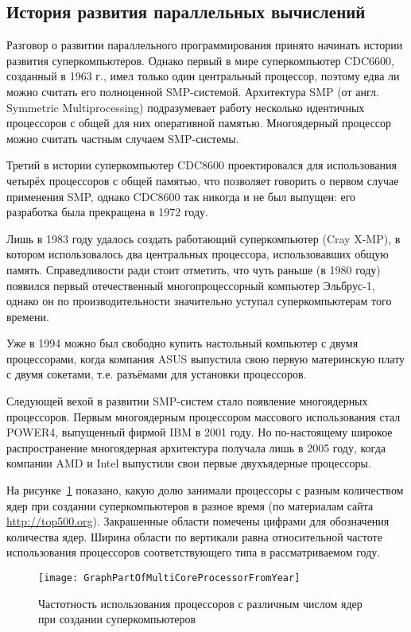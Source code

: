 \subsection{История развития параллельных вычислений}

Разговор о развитии параллельного программирования принято начинать истории развития суперкомпьютеров. Однако первый в мире суперкомпьютер CDC6600, созданный в 1963 г., имел только один центральный процессор, поэтому едва ли можно считать его полноценной SMP-системой. Архитектура SMP (от англ. Symmetric Multiprocessing) подразумевает работу несколько идентичных процессоров с общей для них оперативной памятью. Многоядерный процессор можно считать частным случаем SMP-системы.

Третий в истории суперкомпьютер CDC8600 проектировался для использования четырёх процессоров с общей памятью, что позволяет говорить о первом случае применения SMP, однако CDC8600 так никогда и не был выпущен: его разработка была прекращена в 1972 году.

Лишь в 1983 году удалось создать работающий суперкомпьютер (Cray X-MP), в котором использовалось два центральных процессора, использовавших общую память. Справедливости ради стоит отметить, что чуть раньше (в 1980 году) появился первый отечественный многопроцессорный компьютер Эльбрус-1, однако он по производительности значительно уступал суперкомпьютерам того времени.

Уже в 1994 можно был свободно купить настольный компьютер с двумя процессорами, когда компания ASUS выпустила свою первую материнскую плату с двумя сокетами, т.е. разъёмами для установки процессоров.

Следующей вехой в развитии SMP-систем стало появление многоядерных процессоров. Первым многоядерным процессором массового использования стал POWER4, выпущенный фирмой IBM в 2001 году. Но по-настоящему широкое распространение многоядерная архитектура получала лишь в 2005 году, когда компании AMD и Intel выпустили свои первые двухъядерные процессоры.  

На рисунке~\ref{GraphPartOfMultiCoreProcessorFromYear:image} показано, какую долю занимали процессоры с разным количеством ядер при создании суперкомпьютеров в разное время (по материалам сайта \url{http://top500.org}). Закрашенные области помечены цифрами для обозначения количества ядер. Ширина области по вертикали равна относительной частоте использования процессоров соответствующего типа в рассматриваемом году.

\begin{figure}[H]
    \texttt{[image: GraphPartOfMultiCoreProcessorFromYear]}
    \caption{Частотность использования процессоров с различным числом ядер при создании суперкомпьютеров}
    \label{GraphPartOfMultiCoreProcessorFromYear:image}
\end{figure}

